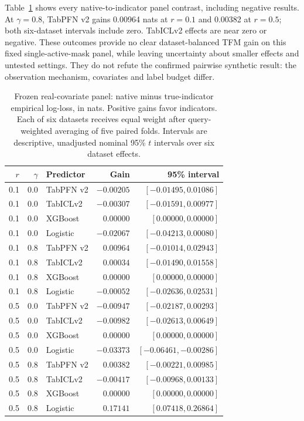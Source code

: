 \documentclass[10pt]{article}
\begin{document}
Table~\ref{tab:realpanel} shows every native-to-indicator panel contrast, including negative results. At $\gamma=0.8$, TabPFN v2 gains 0.00964 nats at $r=0.1$ and 0.00382 at $r=0.5$; both six-dataset intervals include zero. TabICLv2 effects are near zero or negative. These outcomes provide no clear dataset-balanced TFM gain on this fixed single-active-mask panel, while leaving uncertainty about smaller effects and untested settings. They do not refute the confirmed pairwise synthetic result: the observation mechanism, covariates and label budget differ.

\begin{table}[t]
\centering\small
\caption{Frozen real-covariate panel: native minus true-indicator empirical log-loss, in nats. Positive gains favor indicators. Each of six datasets receives equal weight after query-weighted averaging of five paired folds. Intervals are descriptive, unadjusted nominal 95\% $t$ intervals over six dataset effects.}
\label{tab:realpanel}
\begin{tabular}{@{}rrlrr@{}}\toprule
$r$ & $\gamma$ & Predictor & Gain & 95\% interval\\\midrule
0.1 & 0.0 & TabPFN v2 & $-0.00205$ & $[-0.01495,0.01086]$\\
0.1 & 0.0 & TabICLv2 & $-0.00307$ & $[-0.01591,0.00977]$\\
0.1 & 0.0 & XGBoost & $0.00000$ & $[0.00000,0.00000]$\\
0.1 & 0.0 & Logistic & $-0.02067$ & $[-0.04213,0.00080]$\\
0.1 & 0.8 & TabPFN v2 & $0.00964$ & $[-0.01014,0.02943]$\\
0.1 & 0.8 & TabICLv2 & $0.00034$ & $[-0.01490,0.01558]$\\
0.1 & 0.8 & XGBoost & $0.00000$ & $[0.00000,0.00000]$\\
0.1 & 0.8 & Logistic & $-0.00052$ & $[-0.02636,0.02531]$\\
0.5 & 0.0 & TabPFN v2 & $-0.00947$ & $[-0.02187,0.00293]$\\
0.5 & 0.0 & TabICLv2 & $-0.00982$ & $[-0.02613,0.00649]$\\
0.5 & 0.0 & XGBoost & $0.00000$ & $[0.00000,0.00000]$\\
0.5 & 0.0 & Logistic & $-0.03373$ & $[-0.06461,-0.00286]$\\
0.5 & 0.8 & TabPFN v2 & $0.00382$ & $[-0.00221,0.00985]$\\
0.5 & 0.8 & TabICLv2 & $-0.00417$ & $[-0.00968,0.00133]$\\
0.5 & 0.8 & XGBoost & $0.00000$ & $[0.00000,0.00000]$\\
0.5 & 0.8 & Logistic & $0.17141$ & $[0.07418,0.26864]$\\
\bottomrule
\end{tabular}
\end{table}
\end{document}
